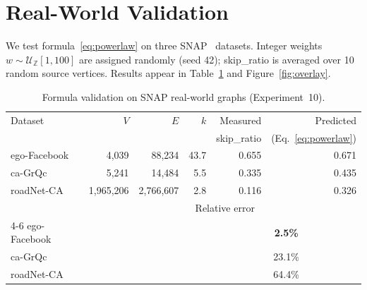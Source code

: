 \documentclass[conference]{IEEEtran}
\begin{document}
\section{Real-World Validation}
\label{sec:realworld}

We test formula~\eqref{eq:powerlaw} on three SNAP~\cite{snapnets}
datasets.  Integer weights $w\sim\mathcal{U}_{\mathbb{Z}}[1,100]$ are
assigned randomly (seed 42); skip\_ratio is averaged over 10 random source
vertices.  Results appear in Table~\ref{tab:realworld} and
Figure~\ref{fig:overlay}.

\begin{table}[t]
\centering
\caption{Formula validation on SNAP real-world graphs (Experiment~10).}
\label{tab:realworld}
\small
\setlength{\tabcolsep}{3pt}
\begin{tabular}{lrrrrr}
\toprule
Dataset & $V$ & $E$ & $k$ & Measured & Predicted \\
 & & & & skip\_ratio & (Eq.~\ref{eq:powerlaw}) \\
\midrule
ego-Facebook  & 4,039    & 88,234    & 43.7 & 0.655 & 0.671 \\
ca-GrQc       & 5,241    & 14,484    & 5.5  & 0.335 & 0.435 \\
roadNet-CA    & 1,965,206& 2,766,607 & 2.8  & 0.116 & 0.326 \\
\midrule
 & & & \multicolumn{2}{c}{Relative error} & \\
\cmidrule(lr){4-6}
ego-Facebook  & & & & \multicolumn{2}{c}{\textbf{2.5\%}} \\
ca-GrQc       & & & & \multicolumn{2}{c}{23.1\%} \\
roadNet-CA    & & & & \multicolumn{2}{c}{64.4\%} \\
\bottomrule
\end{tabular}
\end{table}
\end{document}

